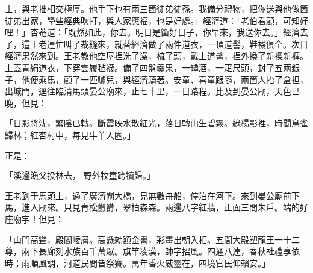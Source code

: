 士，與老拙相交極厚。他手下也有兩三箇徒弟徒孫。我備分禮物，把你送與他做箇徒弟出家，學些經典吹打，與人家應福，也是好處。」經濟道：「老伯看顧，可知好哩！」杏菴道：「既然如此，你去。明日是箇好日子，你早來，我送你去。」經濟去了，這王老連忙叫了裁縫來，就替經濟做了兩件道衣，一頂道髻，鞋襪俱全。次日經濟果然來到。王老教他空屋裡洗了澡，梳了頭，戴上道髻，裡外換了新襖新褲。上蓋青絹道衣，下穿雲履毡襪。備了四盤羹果，一罈酒，一疋尺頭，封了五兩銀子，他便乘馬，顧了一匹驢兒，與經濟騎著。安童、喜童跟隨，兩箇人抬了盒担，出城門，逕往臨清馬頭晏公廟來，止七十里，一日路程。比及到晏公廟，天色已晚，但見：

「日影將沈，繁陰已轉。斷霞映水散紅光，落日轉山生碧霧。綠楊影裡，時聞鳥雀歸林；紅杏村中，每見牛羊入圈。」

正是：

「溪邊漁父投林去，  野外牧童跨犢歸。」

王老到于馬頭上，過了廣濟閘大橋，見無數舟船，停泊在河下。來到晏公廟前下馬，進入廟來。只見青松欝欝，翠柏森森。兩邊八字紅牆，正面三間朱戶。端的好座廟宇！但見：

「山門高聳，殿閣崚層。高懸勑額金書，彩畫出朝入相。五間大殿塑龍王一十二尊，兩下長廊刻水族百千萬眾。旗竿凌漢，帥字招風。四通八達，春秋社禮享依時；雨順風調，河道民間皆祭賽。萬年香火威靈在，四境官民仰賴安。」


